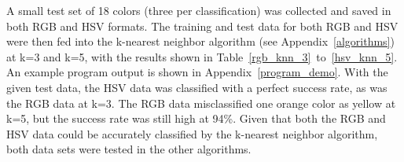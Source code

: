 \documentclass[twoside]{IEEEtran}
\begin{document}
A small test set of 18 colors (three per classification) was collected and saved in both RGB and
HSV formats. The training and test data for both RGB and HSV were then fed into the k-nearest
neighbor algorithm (see Appendix~\ref{algorithms}) at k=3 and k=5, with the results shown in
Table~\ref{rgb_knn_3}~to~\ref{hsv_knn_5}. An example program output is shown in Appendix~\ref{program_demo}.
With the given test data, the HSV data was classified with a perfect success rate, as was the RGB data at k=3.
The RGB data misclassified one orange color as yellow at k=5, but the success rate was still high at 94\%.
Given that both the RGB and HSV data could be accurately classified by the k-nearest neighbor algorithm,
both data sets were tested in the other algorithms.

\begin{table}[!t]
    \centering


\end{table}
\end{document}
